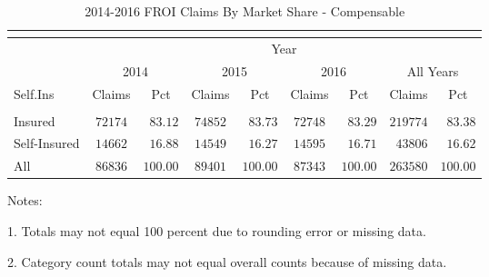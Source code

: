 \documentclass[9pt, oneside]{article}   	%
\begin{document}
\pagebreak

\begin{longtable}{lcccccccc}
\caption{2014-2016 FROI Claims By Market Share - Compensable}\\
\label{Table: Four}\\
\hline
                  \toprule
 & \multicolumn{8}{c}{Year} \\ 
 & \multicolumn{2}{c}{2014} & \multicolumn{2}{c}{2015} & \multicolumn{2}{c}{2016} & \multicolumn{2}{c}{All Years} \\ 
Self.Ins  & Claims & Pct & Claims & Pct & Claims & Pct & Claims & \multicolumn{1}{c}{Pct} \\ 
\midrule\\ [-1\normalbaselineskip]\hline\endhead\hline\endfoot
Insured  & $72174$ & $\phantom{0}83.12$ & $74852$ & $\phantom{0}83.73$ & $72748$ & $\phantom{0}83.29$ & $219774$ & $\phantom{0}83.38$ \\
Self-Insured  & $14662$ & $\phantom{0}16.88$ & $14549$ & $\phantom{0}16.27$ & $14595$ & $\phantom{0}16.71$ & $\phantom{0}43806$ & $\phantom{0}16.62$ \\
\cline{1-1} \cline{2-2} \cline{3-3} \cline{4-4} \cline{5-5} \cline{6-6} \cline{7-7} \cline{8-8} \cline{9-9}%
All  & $86836$ & $100.00$ & $89401$ & $100.00$ & $87343$ & $100.00$ & $263580$ & $100.00$ \\
\hline 
\end{longtable}


    \begin{tablenotes}
      \small
      Notes:\\
      \item 1. Totals may not equal 100 percent due to rounding error or missing data.\\
      \item 2. Category count totals may not equal overall counts because of missing data.
      \end{tablenotes}

\pagebreak
\end{document}
